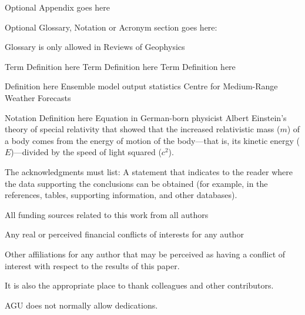 \documentclass[draft,linenumbers]{agujournal2018}
\begin{document}
Optional Appendix goes here

Optional Glossary, Notation or Acronym section goes here:

Glossary is only allowed in Reviews of Geophysics

\begin{glossary}
 Term Definition here
 Term Definition here
 Term Definition here
\end{glossary}

\begin{acronyms}
 Definition here
 Ensemble model output statistics
 Centre for Medium-Range Weather Forecasts
\end{acronyms}

\begin{notation}
 Notation Definition here
Equation in German-born physicist Albert Einstein's theory of special
relativity that showed that the increased relativistic mass ($m$) of a
body comes from the energy of motion of the body—that is, its kinetic
energy ($E$)—divided by the speed of light squared ($c^2$).
\end{notation}

\acknowledgments

The acknowledgments must list: A statement that indicates to the reader
where the data supporting the conclusions can be obtained (for example,
in the references, tables, supporting information, and other databases).

All funding sources related to this work from all authors

Any real or perceived financial conflicts of interests for any author

Other affiliations for any author that may be perceived as having a
conflict of interest with respect to the results of this paper.

It is also the appropriate place to thank colleagues and other
contributors.

AGU does not normally allow dedications.


\end{document}
